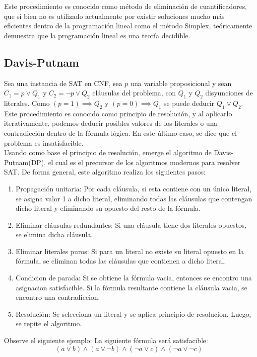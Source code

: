 \documentclass[12pt]{report}
\begin{document}
Este procedimiento es conocido como método de eliminación de cuantificadores, que si bien no es utilizado actualmente por existir soluciones mucho más eficientes dentro de la programación lineal como el método Simplex, teóricamente demuestra que la programación lineal es una teoría decidible.

\subsection{Davis-Putnam}

Sea una instancia de SAT en CNF, sea $p$ una variable proposicional y sean $C_1=p \lor  Q_1$  y  $C_2 = \neg p \lor  Q_2$ cláusulas del problema, con $Q_1$ y $Q_2$ disyunciones de literales. Como $(p=1)\implies  Q_2$ y $(p=0)\implies  Q_1$ se puede deducir $Q_1\lor  Q_2$. Este procedimiento es conocido como principio de resolución, y al aplicarlo iterativamente, podemos deducir posibles valores de los literales o una contradicción dentro de la fórmula lógica. En este último caso, se dice que el problema es insatisfacible.\\ 

Usando como base el principio de resolución, emerge el algoritmo de Davis-Putnam(DP), el cual es el precursor de los algoritmos modernos para resolver SAT. De forma general, este algoritmo realiza los siguientes pasos:
\begin{enumerate}
    \item Propagación unitaria: Por cada cláusula, si esta contiene con un único literal, se asigna valor 1 a dicho literal, eliminando todas las cláusulas que contengan dicho literal y eliminando su opuesto del resto de la fórmula.
    \item Eliminar cláusulas redundantes: Si una cláusula tiene dos literales opuestos, se elimina dicha cláusula.
    \item Eliminar literales puros: Si para un literal no existe su literal opuesto en la fórmula, se eliminan todas las cláusulas que contienen a dicho literal.
    \item Condicion de parada: Si se obtiene la fórmula vacia, entonces se encontro una asignacion satisfacible. Si la fórmula resultante contiene la cláusula vacia, se encontro una contradiccion.
    \item Resolución: Se selecciona un literal y se aplica principio de resolucion. Luego, se repite el algoritmo.
\end{enumerate}

Observe el siguiente ejemplo: La siguiente fórmula será satisfacible:
$$(a\lor  b) \land(a\lor  \neg b) \land (\neg a\lor  c) \land(\neg a\lor  \neg c)$$
\end{document}
